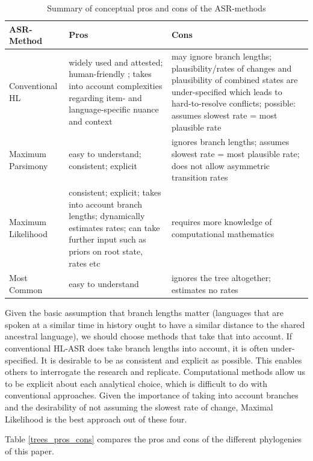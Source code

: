 \documentclass[12pt,letterpaper]{article}
\begin{document}
\begin{table}[ht]
\centering
\caption{Summary of conceptual pros and cons of the ASR-methods}
\label{methods_pros_cpns}
\begin{tabular}{m{4cm}m{5cm}m{5cm}}
  \toprule
\textbf{ASR-Method} & \textbf{Pros} & \textbf{Cons} \\ \midrule
Conventional HL &  widely used and attested; human-friendly ; takes into account complexities regarding item- and language-specific nuance and context &  may ignore branch lengths; plausibility/rates of changes and plausibility of combined states are under-specified which leads to hard-to-resolve conflicts; possible: assumes slowest rate = most plausible rate\\ \midrule
Maximum Parsimony &  easy to understand; consistent; explicit  & ignores branch lengths; assumes slowest rate = most plausible rate; does not allow asymmetric transition rates\\ \midrule
Maximum Likelihood & consistent; explicit; takes into account branch lengths; dynamically estimates rates; can take further input such as priors on root state, rates etc & requires more knowledge of computational mathematics \\ \midrule
Most Common & easy to understand & ignores the tree altogether; estimates no rates  \\
\bottomrule
\end{tabular}
\end{table}

Given the basic assumption that branch lengths matter (languages that are spoken at a similar time in history ought to have a similar distance to the shared ancestral language), we should choose methods that take that into account. If conventional HL-ASR does take branch lengths into account, it is often under-specified. It is desirable to be as consistent and explicit as possible. This enables others to interrogate the research and replicate. Computational methods allow us to be explicit about each analytical choice, which is difficult to do with conventional approaches. Given the importance of taking into account branches and the desirability of not assuming the slowest rate of change, Maximal Likelihood is the best approach out of these four.

Table \ref{trees_pros_cons} compares the pros and cons of the different phylogenies of this paper.
\end{document}
